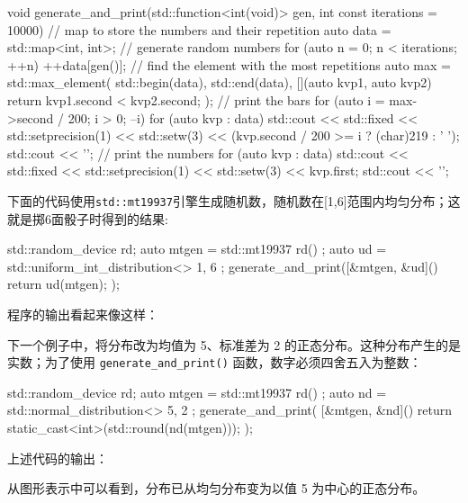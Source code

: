 \begin{cpp}
void generate_and_print(std::function<int(void)> gen,
int const iterations = 10000)
{
    // map to store the numbers and their repetition
    auto data = std::map<int, int>{};
    // generate random numbers
    for (auto n = 0; n < iterations; ++n)
    ++data[gen()];
    // find the element with the most repetitions
    auto max = std::max_element(
    std::begin(data), std::end(data),
    [](auto kvp1, auto kvp2) {
        return kvp1.second < kvp2.second; });
    // print the bars
    for (auto i = max->second / 200; i > 0; --i)
    {
        for (auto kvp : data)
        {
            std::cout
            << std::fixed << std::setprecision(1) << std::setw(3)
            << (kvp.second / 200 >= i ? (char)219 : ' ');
        }
        std::cout << '\n';
    }
    // print the numbers
    for (auto kvp : data)
    {
        std::cout
        << std::fixed << std::setprecision(1) << std::setw(3)
        << kvp.first;
    }
    std::cout << '\n';
}
\end{cpp}

下面的代码使用\verb|std::mt19937|引擎生成随机数，随机数在[1,6]范围内均匀分布；这就是掷6面骰子时得到的结果:

\begin{cpp}
std::random_device rd{};
auto mtgen = std::mt19937{ rd() };
auto ud = std::uniform_int_distribution<>{ 1, 6 };
generate_and_print([&mtgen, &ud]() {return ud(mtgen); });
\end{cpp}

程序的输出看起来像这样：


下一个例子中，将分布改为均值为 5、标准差为 2 的正态分布。这种分布产生的是实数；为了使用 \verb|generate_and_print()| 函数，数字必须四舍五入为整数：

\begin{cpp}
std::random_device rd{};
auto mtgen = std::mt19937{ rd() };
auto nd = std::normal_distribution<>{ 5, 2 };
generate_and_print(
    [&mtgen, &nd]() {
        return static_cast<int>(std::round(nd(mtgen))); });
\end{cpp}

上述代码的输出：


从图形表示中可以看到，分布已从均匀分布变为以值 5 为中心的正态分布。

